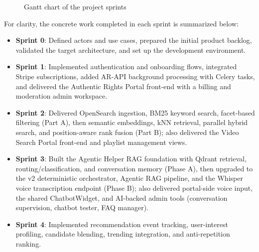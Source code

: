 \begin{figure}[H]
\centering
{}
\caption{Gantt chart of the project sprints}
\label{fig:gantt}
\end{figure}

For clarity, the concrete work completed in each sprint is summarized below:
\begin{itemize}
  \item \textbf{Sprint 0}: Defined actors and use cases, prepared the initial product backlog,
    validated the target architecture, and set up the development environment.
  \item \textbf{Sprint 1}: Implemented authentication and onboarding flows, integrated Stripe
    subscriptions, added AR-API background processing with Celery tasks, and delivered the
    Authentic Rights Portal front-end with a billing and moderation admin workspace.
  \item \textbf{Sprint 2}: Delivered OpenSearch ingestion, BM25 keyword search, facet-based
    filtering (Part A), then semantic embeddings, kNN retrieval, parallel hybrid search, and
    position-aware rank fusion (Part B); also delivered the Video Search Portal front-end and
    playlist management views.
  \item \textbf{Sprint 3}: Built the Agentic Helper RAG foundation with Qdrant retrieval,
    routing/classification, and conversation memory (Phase A), then upgraded to the v2
    deterministic orchestrator, Agentic RAG pipeline, and the Whisper voice transcription
    endpoint (Phase B); also delivered portal-side voice input, the shared ChatbotWidget, and
    AI-backed admin tools (conversation supervision, chatbot tester, FAQ manager).
  \item \textbf{Sprint 4}: Implemented recommendation event tracking, user-interest profiling,
    candidate blending, trending integration, and anti-repetition ranking.
\end{itemize}


